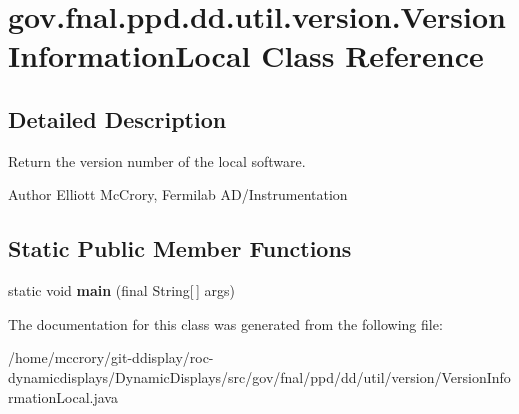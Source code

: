 \hypertarget{classgov_1_1fnal_1_1ppd_1_1dd_1_1util_1_1version_1_1VersionInformationLocal}{\section{gov.\-fnal.\-ppd.\-dd.\-util.\-version.\-Version\-Information\-Local Class Reference}
\label{classgov_1_1fnal_1_1ppd_1_1dd_1_1util_1_1version_1_1VersionInformationLocal}
}


\subsection{Detailed Description}
Return the version number of the local software.

\begin{DoxyAuthor}{Author}
Elliott Mc\-Crory, Fermilab A\-D/\-Instrumentation 
\end{DoxyAuthor}
\subsection*{Static Public Member Functions}
\begin{DoxyCompactItemize}
\item 
\hypertarget{classgov_1_1fnal_1_1ppd_1_1dd_1_1util_1_1version_1_1VersionInformationLocal_a3c31fae7dc534034a8752fbe94689ab3}{static void {\bfseries main} (final String\mbox{[}$\,$\mbox{]} args)}\label{classgov_1_1fnal_1_1ppd_1_1dd_1_1util_1_1version_1_1VersionInformationLocal_a3c31fae7dc534034a8752fbe94689ab3}

\end{DoxyCompactItemize}


The documentation for this class was generated from the following file\-:\begin{DoxyCompactItemize}
\item 
/home/mccrory/git-\/ddisplay/roc-\/dynamicdisplays/\-Dynamic\-Displays/src/gov/fnal/ppd/dd/util/version/Version\-Information\-Local.\-java\end{DoxyCompactItemize}
